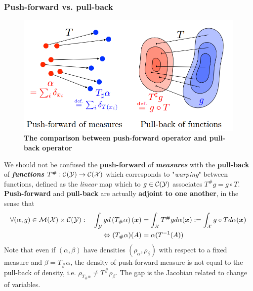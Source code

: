 \documentclass[11pt]{article}
\begin{document}
\subsubsection{Push-forward vs. pull-back}
\begin{figure}
\begin{minipage}[t]{1\linewidth}
  \centering
  \centerline{\includegraphics[scale = 0.3]{push_forward_pull_back.png}}
\end{minipage}
\caption{\footnotesize{\textbf{The comparison between push-forward operator and pull-back operator}}}
\label{fig: push_forward_pull_back}
\end{figure}
We should not be confused the\textbf{ push-forward} of \emph{\textbf{measures}} with the \textbf{pull-back} of \emph{\textbf{functions}} $T^{\#}: {\mathcal C}({\mathcal Y}) \rightarrow {\mathcal C}({\mathcal X})$ which corresponds to "\emph{warping}" between functions, defined as the \emph{linear} map which to $g \in {\mathcal C}({\mathcal Y})$ associates $T^{\#}g = g \circ T$.  \textbf{Push-forward} and \textbf{pull-back} are actually \textbf{adjoint to one another}, in the sense that 
\begin{align}
\forall (\alpha, g) \in {\mathcal M}({\mathcal X}) \times {\mathcal C}({\mathcal Y}): \quad \int_{{\mathcal Y}} g d\left(T_{\#}\alpha\right)(\boldsymbol{x}) &= \int_{{\mathcal X}} T^{\#}g d\alpha(\boldsymbol{x}) := \int_{{\mathcal X}} g \circ T d\alpha(\boldsymbol{x}) \label{eqn: push_forward_pull_back}\\
\Leftrightarrow (T_{\#}\alpha)(A) &= \alpha(T^{-1}(A))
\end{align} Note that even if $(\alpha, \beta)$ have densities $(\rho_{\alpha}, \rho_{\beta})$ with respect to a fixed measure and $\beta = T_{\#}\alpha$, the density of push-forward measure is not equal to the pull-back of density, i.e. $\rho_{T_{\#}\alpha} \neq T^{\#}\rho_{\beta}$. The gap is the Jacobian related to change of variables.
\end{document}
